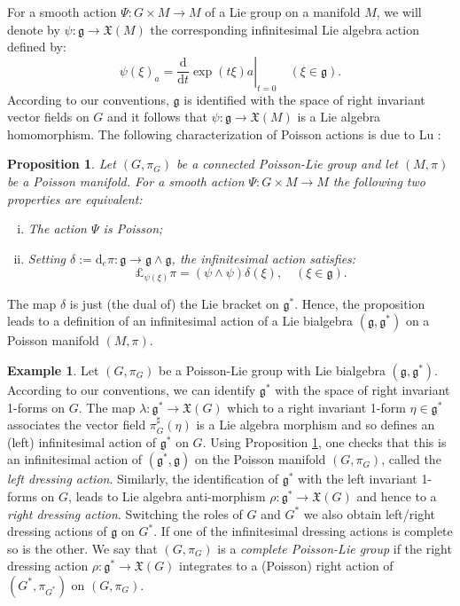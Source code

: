 \documentclass[a4paper,11pt]{amsart}
\newtheorem{prop}[thm]{Proposition}
\theoremstyle{definition}
\newtheorem{ex}[thm]{Example}
\theoremstyle{remark}
\begin{document}
For a smooth action $\Psi:G\times M\to M$ of a Lie group on a manifold $M$, we will denote by
$\psi:{\mathfrak{g}}\to{\ensuremath{\mathfrak{X}}}(M)$ the corresponding infinitesimal Lie algebra action defined by:
\[ \psi(\xi)_a=\left.\frac{\mathrm d}{{\mathrm d} t}\exp(t\xi)a\right|_{t=0}\quad (\xi\in{\mathfrak{g}}).\]
According to our conventions, ${\mathfrak{g}}$ is identified with the space of right invariant vector fields on $G$ and it
follows that $\psi:{\mathfrak{g}}\to {\ensuremath{\mathfrak{X}}}(M)$ is a Lie algebra homomorphism. The following characterization of Poisson
actions is due to Lu \cite{Lu,Lu1}:

\begin{prop}
\label{prop:Poisson:actions:1}
Let $(G,\pi_G)$ be a connected Poisson-Lie group and let $(M,\pi)$ be a Poisson manifold.
For a smooth action $\Psi:G\times M\to M$ the following two properties are equivalent:
\begin{enumerate}[(i)]
\item The action $\Psi$ is Poisson;
\item Setting $\delta:={\mathrm d}_e\pi:{\mathfrak{g}}\to{\mathfrak{g}}\wedge{\mathfrak{g}}$, the infinitesimal action satisfies:
\[ {\boldsymbol{\pounds}}_{\psi(\xi)}\pi=(\psi\wedge\psi)\delta(\xi),\quad (\xi\in{\mathfrak{g}}).\]
\end{enumerate}
\end{prop}

The map $\delta$ is just (the dual of) the Lie bracket on ${\mathfrak{g}}^*$. Hence, the proposition leads to a definition
of an infinitesimal action of a Lie bialgebra $({\mathfrak{g}},{\mathfrak{g}}^*)$ on a Poisson manifold $(M,\pi)$.

\begin{ex}
Let $(G,\pi_G)$ be a Poisson-Lie group with Lie bialgebra $({\mathfrak{g}},{\mathfrak{g}}^*)$. According to our conventions, we can
identify ${\mathfrak{g}}^*$ with the space of right invariant 1-forms on $G$. The map $\lambda:{\mathfrak{g}}^*\to{\ensuremath{\mathfrak{X}}}(G)$ which to a
right invariant 1-form $\eta\in{\mathfrak{g}}^*$ associates the vector field $\pi_G^\sharp(\eta)$ is a Lie algebra morphism
and so defines an (left) infinitesimal action of ${\mathfrak{g}}^*$ on $G$. Using Proposition \ref{prop:Poisson:actions:1},
one checks that this is an infinitesimal action of $({\mathfrak{g}}^*,{\mathfrak{g}})$ on the Poisson manifold $(G,\pi_G)$, called the
\emph{left dressing action}. Similarly, the identification of ${\mathfrak{g}}^*$ with the left invariant 1-forms on $G$,
leads to Lie algebra anti-morphism $\rho:{\mathfrak{g}}^*\to{\ensuremath{\mathfrak{X}}}(G)$ and hence to a \emph{right dressing action}. Switching
the roles of $G$ and $G^*$ we also obtain left/right dressing actions of ${\mathfrak{g}}$ on $G^*$. If one of the
infinitesimal dressing actions is complete so is the other. We say that $(G,\pi_G)$ is a \emph{complete
Poisson-Lie group} if the right dressing action $\rho:{\mathfrak{g}} ^*\to{\ensuremath{\mathfrak{X}}}(G)$ integrates to a (Poisson) right action of
$(G^*,\pi_{G^*})$ on $(G,\pi_G)$.
\end{ex}
\end{document}
